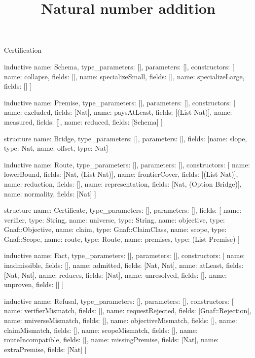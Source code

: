 \begin{lexlean}{Certification}
\title{Natural number addition}
\begin{semanticmodule}
inductive{
  name: Schema,
  type_parameters: [],
  parameters: [],
  constructors: [
    {name: collapse, fields: []},
    {name: specializeSmall, fields: []},
    {name: specializeLarge, fields: []}
  ]
}

inductive{
  name: Premise,
  type_parameters: [],
  parameters: [],
  constructors: [
    {name: excluded, fields: [Nat]},
    {name: paysAtLeast, fields: [(List Nat)]},
    {name: measured, fields: []},
    {name: reduced, fields: [Schema]}
  ]
}

structure{
  name: Bridge,
  type_parameters: [],
  parameters: [],
  fields: [{name: slope, type: Nat}, {name: offset, type: Nat}]
}

inductive{
  name: Route,
  type_parameters: [],
  parameters: [],
  constructors: [
    {name: lowerBound, fields: [Nat, (List Nat)]},
    {name: frontierCover, fields: [(List Nat)]},
    {name: reduction, fields: []},
    {name: representation, fields: [Nat, (Option Bridge)]},
    {name: normality, fields: [Nat]}
  ]
}

structure{
  name: Certificate,
  type_parameters: [],
  parameters: [],
  fields: [
    {name: verifier, type: String},
    {name: universe, type: String},
    {name: objective, type: Gnaf::Objective},
    {name: claim, type: Gnaf::ClaimClass},
    {name: scope, type: Gnaf::Scope},
    {name: route, type: Route},
    {name: premises, type: (List Premise)}
  ]
}

inductive{
  name: Fact,
  type_parameters: [],
  parameters: [],
  constructors: [
    {name: inadmissible, fields: []},
    {name: admitted, fields: [Nat, Nat]},
    {name: atLeast, fields: [Nat, Nat]},
    {name: reduces, fields: [Nat]},
    {name: unresolved, fields: []},
    {name: unproven, fields: []}
  ]
}

inductive{
  name: Refusal,
  type_parameters: [],
  parameters: [],
  constructors: [
    {name: verifierMismatch, fields: []},
    {name: requestRejected, fields: [Gnaf::Rejection]},
    {name: universeMismatch, fields: []},
    {name: objectiveMismatch, fields: []},
    {name: claimMismatch, fields: []},
    {name: scopeMismatch, fields: []},
    {name: routeIncompatible, fields: []},
    {name: missingPremise, fields: [Nat]},
    {name: extraPremise, fields: [Nat]}
  ]
}


\end{semanticmodule}
\end{lexlean}
